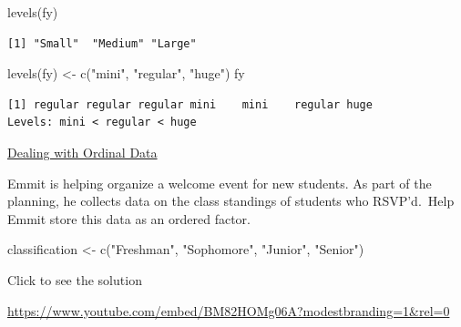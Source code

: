 \documentclass[
  letterpaper,
  DIV=11,
  numbers=noendperiod]{scrreprt}
\newenvironment{Shaded}{\begin{snugshade}}{\end{snugshade}}
\newcommand{\FunctionTok}[1]{\textcolor[rgb]{0.28,0.35,0.67}{#1}}
\newcommand{\NormalTok}[1]{\textcolor[rgb]{0.00,0.23,0.31}{#1}}
\newcommand{\OtherTok}[1]{\textcolor[rgb]{0.00,0.23,0.31}{#1}}
\newcommand{\StringTok}[1]{\textcolor[rgb]{0.13,0.47,0.30}{#1}}
\begin{document}
\begin{Shaded}
\begin{Highlighting}[]
\FunctionTok{levels}\NormalTok{(fy)}
\end{Highlighting}
\end{Shaded}

\begin{verbatim}
[1] "Small"  "Medium" "Large" 
\end{verbatim}

\begin{Shaded}
\begin{Highlighting}[]
\FunctionTok{levels}\NormalTok{(fy) }\OtherTok{\textless{}{-}} \FunctionTok{c}\NormalTok{(}\StringTok{"mini"}\NormalTok{, }\StringTok{"regular"}\NormalTok{, }\StringTok{"huge"}\NormalTok{)}
\NormalTok{fy}
\end{Highlighting}
\end{Shaded}

\begin{verbatim}
[1] regular regular regular mini    mini    regular huge   
Levels: mini < regular < huge
\end{verbatim}

\begin{watch}{}{}
    \href{https://youtu.be/_PfBPa3GQWM}{Dealing with Ordinal Data}
\end{watch}

\begin{tcolorbox}[enhanced jigsaw, leftrule=.75mm, arc=.35mm, coltitle=black, rightrule=.15mm, bottomrule=.15mm, toprule=.15mm, left=2mm, colbacktitle=quarto-callout-tip-color!10!white, title=\textcolor{quarto-callout-tip-color}{\faLightbulb}\hspace{0.5em}{Try it Out}, toptitle=1mm, breakable, colframe=quarto-callout-tip-color-frame, bottomtitle=1mm, titlerule=0mm, colback=white, opacityback=0, opacitybacktitle=0.6]

Emmit is helping organize a welcome event for new students. As part of
the planning, he collects data on the class standings of students who
RSVP'd.~Help Emmit store this data as an ordered factor.

\begin{Shaded}
\begin{Highlighting}[]
\NormalTok{classification }\OtherTok{\textless{}{-}} \FunctionTok{c}\NormalTok{(}\StringTok{"Freshman"}\NormalTok{, }\StringTok{"Sophomore"}\NormalTok{, }\StringTok{"Junior"}\NormalTok{, }\StringTok{"Senior"}\NormalTok{)}
\end{Highlighting}
\end{Shaded}

Click to see the solution

\url{https://www.youtube.com/embed/BM82HOMg06A?modestbranding=1&rel=0}

\end{tcolorbox}
\end{document}
